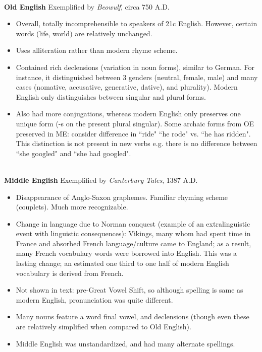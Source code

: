 \documentclass{exam}
\begin{document}
\noindent \textbf{\\Old English} Exemplified by \textit{Beowulf}, circa 750 A.D. 
\begin{itemize}

\item Overall, totally incomprehensible to speakers of 21c English. 
However, certain words (life, world) are relatively unchanged.
\item Uses alliteration rather than modern rhyme scheme. 
\item Contained rich declensions (variation in noun forms), similar to German. 
For instance, it distinguished between 3 genders (neutral, female, male) and many cases (nomative, accusative, generative, dative), and plurality). 
Modern English only distinguishes between singular and plural forms. 

\item Also had more conjugations, whereas modern English only preserves one unique form (-s on the present plural singular). 
Some archaic forms from OE preserved in ME: consider difference in ``ride" ``he rode" vs. ``he has ridden". 
This distinction is not present in new verbs e.g. there is no difference between ``she googled" and ``she had googled". 


\end{itemize}

\noindent \textbf{\\Middle English} Exemplified by \textit{Canterbury Tales}, 1387 A.D. 
\begin{itemize}

\item Disappearance of Anglo-Saxon graphemes. 
    Familiar rhyming scheme (couplets). 
Much more recognizable. 
\item Change in language due to Norman conquest (example of an extralinguistic event with linguistic consequences): Vikings, many whom had spent time in France and absorbed French language/culture came to England; as a result, many French vocabulary words were borrowed into English. 
This was a lasting change; an estimated one third to one half of modern English vocabulary is derived from French. 
\item Not shown in text: pre-Great Vowel Shift, so although spelling is same as modern English, pronunciation was quite different. 
\item Many nouns feature a word final vowel, and declensions (though even these are relatively simplified when compared to Old English). 
\item Middle English was unstandardized, and had many alternate spellings. 
\end{itemize}
\end{document}
